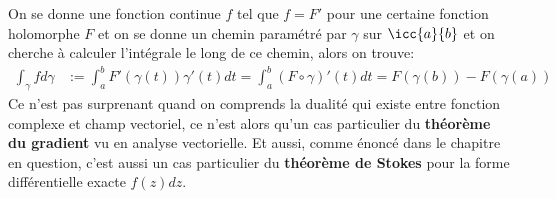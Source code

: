 \subsection*{}
On se donne une fonction continue \(f\) tel que \(f =  F'\) pour une certaine fonction holomorphe \(F\) et on se donne un chemin paramétré par \(\gamma\) sur \(\icc{a}{b}\) et on cherche à calculer l'intégrale le long de ce chemin, alors on trouve:
\begin{align*}
   \int_{\gamma} f d \gamma &:= \int_{a}^{b} F'(\gamma(t))\gamma'(t)d t = \int_{a}^{b} (F \circ \gamma)'(t) d t = F(\gamma(b)) - F(\gamma(a))
\end{align*}
Ce n'est pas surprenant quand on comprends la dualité qui existe entre fonction complexe et champ vectoriel, ce n'est alors qu'un cas particulier du \textbf{théorème du gradient} vu en analyse vectorielle. Et aussi, comme énoncé dans le chapitre en question, c'est aussi un cas particulier du \textbf{théorème de Stokes} pour la forme différentielle exacte \(f(z)dz\).


\chapter*{} %


\chapter*{} %
